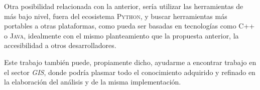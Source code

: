 Otra posibilidad relacionada con la anterior, sería utilizar las herramientas de más bajo nivel, fuera del ecosistema \textsc{Python}, y buscar herramientas más portables a otras plataformas, como pueda ser basadas en tecnologías como \textsc{C++} o \textsc{Java}, idealmente con el mismo planteamiento que la propuesta anterior, la accesibilidad a otros desarrolladores.

Este trabajo también puede, propiamente dicho, ayudarme a encontrar trabajo en el sector \textit{GIS}, donde podría plasmar todo el conocimiento adquirido y refinado en la elaboración del análisis y de la misma implementación.